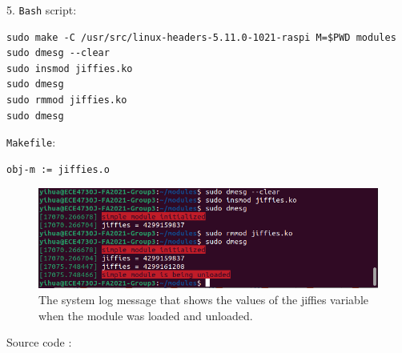 \documentclass[a4paper]{article}
\begin{document}
5. \texttt{Bash} script:
\begin{verbatim}
sudo make -C /usr/src/linux-headers-5.11.0-1021-raspi M=$PWD modules
sudo dmesg --clear
sudo insmod jiffies.ko
sudo dmesg
sudo rmmod jiffies.ko
sudo dmesg
\end{verbatim}
\texttt{Makefile}:
\begin{verbatim}
obj-m := jiffies.o
\end{verbatim}
\begin{figure}[H]
    \centering
    \includegraphics[width=1\textwidth]{6.png}
    \caption{The system log message that shows the values of the jiffies variable when the module was loaded and unloaded.}
\end{figure}
Source code \cite{jiffies}:
\inputminted[frame=single,bgcolor=bg,breaklines,linenos]{c}{modules/jiffies.c}
\printbibliography
\end{document}
